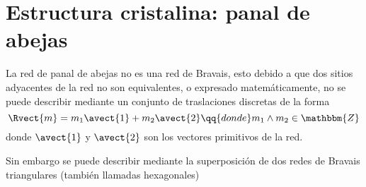 \section{Estructura cristalina: panal de abejas}

La red de panal de abejas no es una red de Bravais, esto debido a que dos sitios 
adyacentes de la red no son equivalentes, o expresado matemáticamente, no se puede 
describir mediante un conjunto de traslaciones discretas de la forma
\begin{equation}\label{eq:bravais}
\Rvect{m} = m_1\avect{1} + m_2\avect{2} \qq{donde} m_1 \land m_2 \in \mathbbm{Z}
\end{equation}
donde $ \avect{1} $ y $ \avect{2} $ son los vectores primitivos de la red.

Sin embargo se puede describir mediante la superposición de dos redes de Bravais 
triangulares (también llamadas hexagonales)

